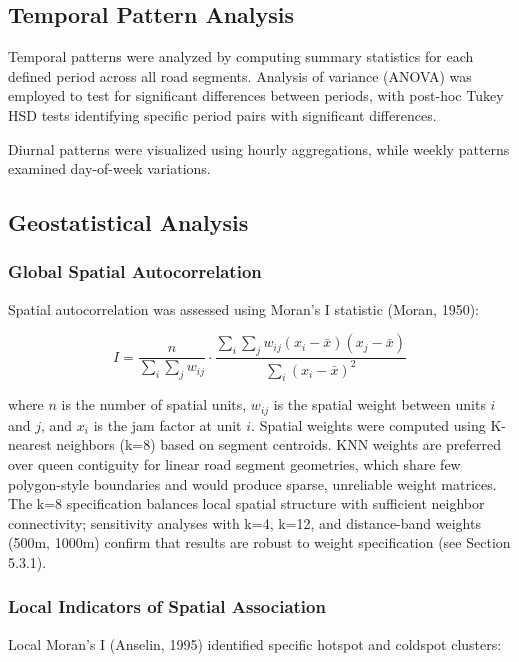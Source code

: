 \documentclass[12pt,a4paper]{article}
\begin{document}
\subsection{Temporal Pattern Analysis}

Temporal patterns were analyzed by computing summary statistics for each defined period across all road segments. Analysis of variance (ANOVA) was employed to test for significant differences between periods, with post-hoc Tukey HSD tests identifying specific period pairs with significant differences.

Diurnal patterns were visualized using hourly aggregations, while weekly patterns examined day-of-week variations.

\subsection{Geostatistical Analysis}

\subsubsection{Global Spatial Autocorrelation}

Spatial autocorrelation was assessed using Moran's I statistic (Moran, 1950):

\[I = \frac{n}{\sum_i \sum_j w_{ij}} \cdot \frac{\sum_i \sum_j w_{ij}(x_i - \bar{x})(x_j - \bar{x})}{\sum_i (x_i - \bar{x})^2}\]

where \(n\) is the number of spatial units, \(w_{ij}\) is the spatial weight between units \(i\) and \(j\), and \(x_i\) is the jam factor at unit \(i\). Spatial weights were computed using K-nearest neighbors (k=8) based on segment centroids. KNN weights are preferred over queen contiguity for linear road segment geometries, which share few polygon-style boundaries and would produce sparse, unreliable weight matrices. The k=8 specification balances local spatial structure with sufficient neighbor connectivity; sensitivity analyses with k=4, k=12, and distance-band weights (500m, 1000m) confirm that results are robust to weight specification (see Section 5.3.1).

\subsubsection{Local Indicators of Spatial Association}

Local Moran's I (Anselin, 1995) identified specific hotspot and coldspot clusters:
\end{document}

